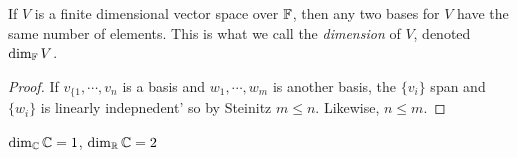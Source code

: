 \documentclass[a4paper]{article}
\begin{document}
\begin{thm} 
	If $ V $ is a finite dimensional vector space over $ \mathbb{F} $, then any two bases for $ V $ have the same number of elements. This is what we call the \emph{dimension} of $ V $, denoted $ \dim_{\mathbb{F}} V $.
\end{thm}

\begin{proof}
	If $ v_{\{1},\cdots,v_{n} $ is a basis and $ w_{1},\cdots,w_{m} $ is another basis, the $ \{ v_{i} \} $ span and $ \{ w_{i} \} $ is linearly indepnedent' so by Steinitz $ m \leq n $. Likewise, $ n \leq m $.
\end{proof}


\begin{eg}
	$ \dim_{\mathbb{C}} \mathbb{C} = 1 $, $ \dim_{\mathbb{R}} \mathbb{C} = 2 $
\end{eg}





\subsection{}
\end{document}
